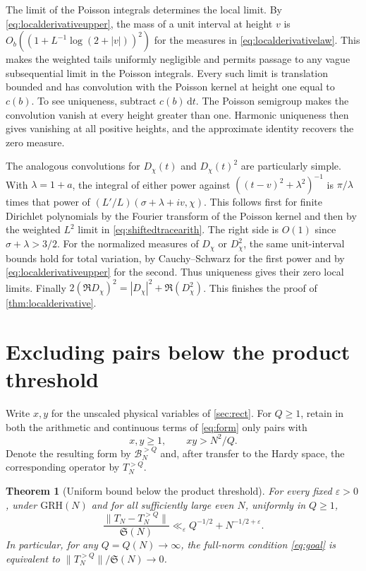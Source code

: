 \documentclass[11pt,a4paper]{article}
\numberwithin{equation}{section}
\newtheorem{theorem}{Theorem}[section]
\newcommand{\SSS}{\mathfrak S}
\newcommand{\grh}{\mathrm{GRH}}
\newcommand{\ud}{\mathrm d}
\newcommand{\B}{\mathcal B_N}
\begin{document}
The limit of the Poisson integrals determines the local
limit. By \cref{eq:localderivativeupper}, the mass of a
unit interval at height $v$ is
$O_b((1+L^{-1}\log(2+|v|))^2)$ for the measures in
\cref{eq:localderivativelaw}. This makes the weighted
tails uniformly negligible and permits passage to any
vague subsequential limit in the Poisson integrals.
Every such limit is translation bounded and has
convolution with the Poisson kernel at height one
equal to $c(b)$. To see uniqueness, subtract $c(b)\,\ud t$.
The Poisson semigroup makes the convolution vanish at
every height greater than one. Harmonic uniqueness
then gives vanishing at all positive heights, and the
approximate identity recovers the zero measure.

The analogous convolutions for $D_\chi(t)$ and $D_\chi(t)^2$
are particularly simple. With $\lambda=1+a$, the integral
of either power against $((t-v)^2+\lambda^2)^{-1}$ is
$\pi/\lambda$ times that power of
$(L'/L)(\sigma+\lambda+iv,\chi)$. This follows first for
finite Dirichlet polynomials by the Fourier transform
of the Poisson kernel and then by the weighted $L^2$
limit in \cref{eq:shiftedtracearith}. The right side is
$O(1)$ since $\sigma+\lambda>3/2$. For the normalized
measures of $D_\chi$ or $D_\chi^2$, the same unit-interval
bounds hold for total variation, by Cauchy--Schwarz for
the first power and by \cref{eq:localderivativeupper}
for the second. Thus uniqueness gives their zero local limits.
Finally $2(\Re D_\chi)^2=|D_\chi|^2+\Re(D_\chi^2)$.
This finishes the proof of \cref{thm:localderivative}.

\section{Excluding pairs below the product threshold}
\label{sec:subcritical}

Write $x,y$ for the unscaled physical variables of \cref{sec:rect}.
For $Q\ge1$, retain in both the arithmetic and continuous terms of
\cref{eq:form} only pairs with
\[
       x,y\ge1,\qquad xy>N^2/Q.
\]
Denote the resulting form by $\B^{>Q}$ and, after transfer to the
Hardy space, the corresponding operator by $T_N^{>Q}$.

\begin{theorem}[Uniform bound below the product threshold]
\label{thm:subcritical}
For every fixed $\varepsilon>0$, under $\grh(N)$ and for all
sufficiently large even $N$, uniformly in $Q\ge1$,
\begin{equation}
  \frac{\|T_N-T_N^{>Q}\|}{\SSS(N)}
      \ll_\varepsilon Q^{-1/2}+N^{-1/2+\varepsilon}.
  \label{eq:subcritical}
\end{equation}
In particular, for any $Q=Q(N)\to\infty$, the full-norm
condition \cref{eq:goal} is equivalent to
$\|T_N^{>Q}\|/\SSS(N)\to0$.
\end{theorem}
\end{document}

